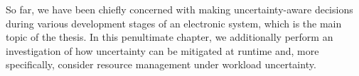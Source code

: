 So far, we have been chiefly concerned with making uncertainty-aware decisions
during various development stages of an electronic system, which is the main
topic of the thesis. In this penultimate chapter, we additionally perform an
investigation of how uncertainty can be mitigated at runtime and, more
specifically, consider resource management under workload uncertainty.

\section{\introductiontitle}

\section{\problemtitle}

\section{\priortitle}

\section{\solutiontitle}

\section{\resultstitle}

\section{\conclusiontitle}
